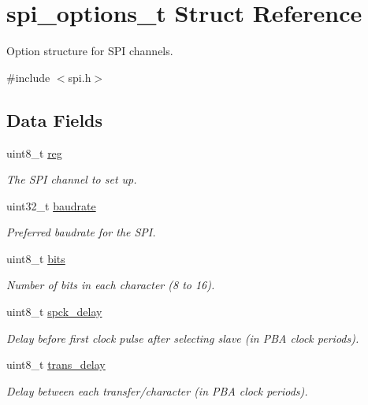 \hypertarget{structspi__options__t}{
\section{spi\-\_\-options\-\_\-t \-Struct \-Reference}
\label{structspi__options__t}
}


\-Option structure for \-S\-P\-I channels.  




{\ttfamily \#include $<$spi.\-h$>$}

\subsection*{\-Data \-Fields}
\begin{DoxyCompactItemize}
\item 
uint8\-\_\-t \hyperlink{structspi__options__t_a9f89caeb223b8e82f29628a47eb66f9a}{reg}
\begin{DoxyCompactList}\small\item\em \-The \-S\-P\-I channel to set up. \end{DoxyCompactList}\item 
uint32\-\_\-t \hyperlink{structspi__options__t_a397070a4a1f42ac5c8e45538b0cd0163}{baudrate}
\begin{DoxyCompactList}\small\item\em \-Preferred baudrate for the \-S\-P\-I. \end{DoxyCompactList}\item 
uint8\-\_\-t \hyperlink{structspi__options__t_a99da3363b981ddff67b8463f760ac22d}{bits}
\begin{DoxyCompactList}\small\item\em \-Number of bits in each character (8 to 16). \end{DoxyCompactList}\item 
uint8\-\_\-t \hyperlink{structspi__options__t_a86f15a4bd903dc7f46001b017d6396c8}{spck\-\_\-delay}
\begin{DoxyCompactList}\small\item\em \-Delay before first clock pulse after selecting slave (in \-P\-B\-A clock periods). \end{DoxyCompactList}\item 
uint8\-\_\-t \hyperlink{structspi__options__t_aedb727a3304efbedc75f61c3312c6dae}{trans\-\_\-delay}
\begin{DoxyCompactList}\small\item\em \-Delay between each transfer/character (in \-P\-B\-A clock periods). \end{DoxyCompactList}\item 

\end{DoxyCompactItemize}
